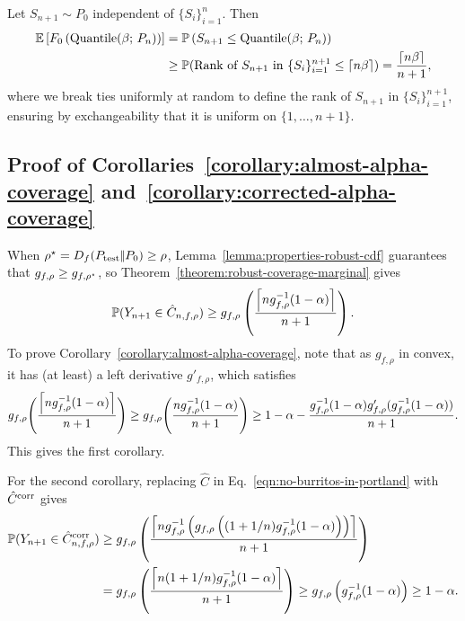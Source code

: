 \begin{proof-of-lemma}[\ref{lemma:conformal-inference-coverage-cdf}]
  Let $ S_{n+1} \sim P_0$ independent of $\{ S_i \}_{i=1}^n$. Then
  \begin{align*}
    \mathbb{E} \left[ F_0\left( \textup{Quantile}(\beta; \, P_n) \right) \right] 
    &= \mathbb{P}\left( S_{n+1} \le  \textup{Quantile}(\beta; \, P_n) \right) \\
    &\ge \mathbb{P}( \text{Rank of } S_{n+1} \text{ in } \{S_i\}_{i=1}^{n+1} \le \left\lceil{n \beta}\right\rceil)
    = \frac{\left\lceil{n \beta}\right\rceil}{n+1},
  \end{align*}
  where we break ties uniformly at random to define the rank of $S_{n+1}$ in
  $\{S_i\}_{i=1}^{n+1}$, ensuring by exchangeability that it is uniform on
  $\{1,\ldots, n+1\}$.
\end{proof-of-lemma}


\subsection{Proof of Corollaries~\ref{corollary:almost-alpha-coverage}
  and~\ref{corollary:corrected-alpha-coverage}}
\label{sec:proof-alpha-coverages}

When $\rho^\star = D_{f}({P_{\textup{test}}} |\!| {P_0}) \ge \rho$,
Lemma~\ref{lemma:properties-robust-cdf} guarantees that $g_{f,\rho} \ge
g_{f,\rho^\star}$, so Theorem~\ref{theorem:robust-coverage-marginal}
gives
\begin{equation}
  \label{eqn:no-burritos-in-portland}
  \mathbb{P}(Y_{ n +1} \in \hat{C}_{n,f,\rho})
  \ge
  g_{f,\rho}\left(\frac{\left\lceil{n g_{f,\rho}^{-1}(1 - \alpha)}\right\rceil}{n+1}\right).
\end{equation}
To prove Corollary~\ref{corollary:almost-alpha-coverage},
note that as $g_{f,\rho}$ in convex, it has (at least) a left
derivative $g'_{f,\rho}$, which satisfies
\begin{align*}
g_{f,\rho}\Biggr( \frac{\left\lceil{n g_{f,\rho}^{-1}(1-\alpha)}\right\rceil}{n+1}\Biggr) \ge g_{f,\rho}\Biggr( \frac{n g_{f,\rho}^{-1}(1-\alpha)}{n+1}\Biggr) \ge 1 - \alpha - \frac{g_{f,\rho}^{-1}(1-\alpha) g'_{f,\rho} (g_{f,\rho}^{-1}(1-\alpha))}{n+1}.
\end{align*}
This gives the first corollary.

For the second corollary, replacing $\hat{C}$ in
Eq.~\eqref{eqn:no-burritos-in-portland}
with $\hat{C}^{\textup{corr}}$ gives
\begin{align*}
  \mathbb{P}(Y_{ n +1} \in \hat{C}^{\textup{corr}}_{n,f,\rho})
  & \ge
  g_{f,\rho}\left(
  \frac{\left\lceil{n g_{f,\rho}^{-1}
      \left(g_{f,\rho}\left((1 + 1/n) g_{f,\rho}^{-1}(1 - \alpha)\right)\right)}\right\rceil
  }{n+1}\right) \\
  & = g_{f,\rho}\left(\frac{\left\lceil{n(1 + 1/n) g_{f,\rho}^{-1}(1 - \alpha)}\right\rceil}{
    n + 1}\right)
  \ge g_{f,\rho}\left(g_{f,\rho}^{-1}(1 - \alpha)\right)
  \ge 1 - \alpha.
\end{align*}
